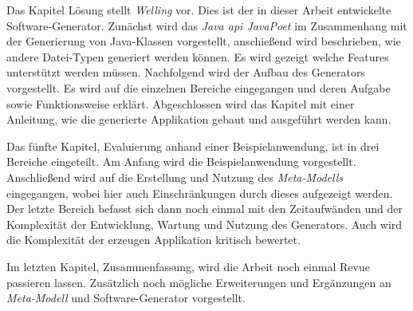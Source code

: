 Das Kapitel Lösung stellt \textit{Welling} vor. Dies ist der in dieser Arbeit entwickelte Software-Generator. Zunächst wird das \textit{Java \acf{api} JavaPoet} im Zusammenhang mit der Generierung von Java-Klassen vorgestellt, anschießend wird beschrieben, wie andere Datei-Typen generiert werden können. Es wird gezeigt welche Features unterstützt werden müssen. Nachfolgend wird der Aufbau des Generators vorgestellt. Es wird auf die einzelnen Bereiche eingegangen und deren Aufgabe sowie Funktionsweise erklärt. Abgeschlossen wird das Kapitel mit einer Anleitung, wie die generierte Applikation gebaut und ausgeführt werden kann.

Das fünfte Kapitel, Evaluierung anhand einer Beispielanwendung, ist in drei Bereiche eingeteilt. Am Anfang wird die Beispielanwendung vorgestellt. Anschließend wird auf die Erstellung und Nutzung des \textit{Meta-Modells} eingegangen, wobei hier auch Einschränkungen durch dieses aufgezeigt werden. Der letzte Bereich befasst sich dann noch einmal mit den Zeitaufwänden und der Komplexität der Entwicklung, Wartung und Nutzung des Generators. Auch wird die Komplexität der erzeugen Applikation kritisch bewertet.

Im letzten Kapitel, Zusammenfassung, wird die Arbeit noch einmal Revue passieren lassen. Zusätzlich noch mögliche Erweiterungen und Ergänzungen an \textit{Meta-Modell} und Software-Generator vorgestellt.
